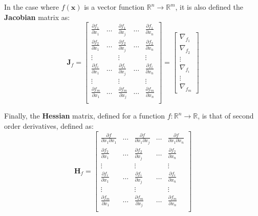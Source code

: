 In the case where $f(\mathbf{x})$ is a vector function $\mathbb{R}^n \rightarrow \mathbb{R}^m$, it is also defined the \textbf{Jacobian} matrix as: 
\begin{equation}
 \mathbf{J}_f = 
 \left[
\begin{array}{ccccc}
  \frac{\partial f_1 }{\partial x_1} & \dots & \frac{\partial f_1 }{\partial x_j} & \dots & \frac{\partial f_1 }{\partial x_n} \\
  \frac{\partial f_2 }{\partial x_1} & \dots & \frac{\partial f_2 }{\partial x_j} & \dots & \frac{\partial f_2 }{\partial x_n} \\
  \vdots & & \vdots & & \vdots \\
  \frac{\partial f_i }{\partial x_1} & \dots & \frac{\partial f_i }{\partial x_j} & \dots & \frac{\partial f_i }{\partial x_n} \\
  \vdots & & \vdots & & \vdots \\
  \frac{\partial f_m }{\partial x_1} & \dots & \frac{\partial f_m }{\partial x_j} & \dots & \frac{\partial f_m }{\partial x_n} \\
\end{array}
\right] = 
\left[
\begin{array}{c}
 \nabla_{f_1} \\
 \nabla_{f_2} \\
 \vdots \\
 \nabla_{f_i} \\
 \vdots \\
 \nabla_{f_m}
\end{array}
\right]
\end{equation}

Finally, the \textbf{Hessian} matrix, defined for a function $f:\mathbb{R}^n \rightarrow \mathbb{R}$, is that of second order derivatives, defined as: 
\begin{equation}
 \mathbf{H}_f = 
 \left[
\begin{array}{ccccc}
  \frac{\partial f }{\partial x_1 \partial x_1} & \dots & \frac{\partial f}{\partial x_1 \partial x_j} & \dots & \frac{\partial f }{\partial x_1 \partial x_n} \\
  \frac{\partial f_2 }{\partial x_1} & \dots & \frac{\partial f_2 }{\partial x_j} & \dots & \frac{\partial f_2 }{\partial x_n} \\
  \vdots & & \vdots & & \vdots \\
  \frac{\partial f_i }{\partial x_1} & \dots & \frac{\partial f_i }{\partial x_j} & \dots & \frac{\partial f_i }{\partial x_n} \\
  \vdots & & \vdots & & \vdots \\
  \frac{\partial f_m }{\partial x_1} & \dots & \frac{\partial f_m }{\partial x_j} & \dots & \frac{\partial f_m }{\partial x_n} \\
\end{array}
\right]
\end{equation}


